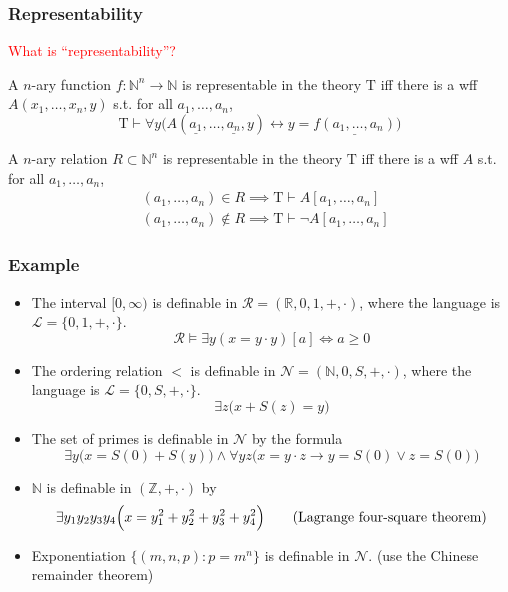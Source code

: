 \documentclass[UTF8,11pt,colorlinks,compress,openany]{beamer}%
\begin{document}
\begin{frame}\frametitle{Representability}
	\begin{block}{}
		\begin{center}
			\textcolor{red}{What is ``representability''?}
		\end{center}
	\end{block}
	\begin{definition}
		A $n$-ary function $f:\mathbb{N}^n\to\mathbb{N}$ is representable in the theory $\mathrm{T}$ iff there is a wff $A(x_1,\dots,x_n,y)$ s.t. for all $a_1,\dots,a_n$,
	\setlength\belowdisplayskip{0pt}
		\[\mathrm{T}\vdash\forall y\Big(A(\underline{a_1},\dots,\underline{a_n},y)\leftrightarrow y=\underline{f(a_1,\dots,a_n)}\Big)\]
	\end{definition}
	\begin{definition}
		A $n$-ary relation $R\subset\mathbb{N}^n$ is representable in the theory $\mathrm{T}$ iff there is a wff $A$ s.t. for all $a_1,\dots,a_n$,
	\setlength\abovedisplayskip{0pt}
	\setlength\belowdisplayskip{0pt}
		\begin{align*}
		&(a_1,\dots,a_n)\in R\implies \mathrm{T}\vdash A[a_1,\dots,a_n]\\
		&(a_1,\dots,a_n)\notin R\implies \mathrm{T}\vdash\neg A[a_1,\dots,a_n]
		\end{align*}
	\end{definition}
	\centering{}
\end{frame}

\begin{frame}\frametitle{Example}
	\begin{itemize}
		\item The interval $[0,\infty)$ is definable in $\mathcal{R}=(\mathbb{R},0,1,+,\cdot)$, where the language is $\mathscr{L}=\{0,1,+,\cdot\}$.
		\[\mathcal{R}\vDash\exists y(x=y\cdot y)[a]\iff a\geq 0\]
		\item The ordering relation $<$ is definable in $\mathcal{N}=(\mathbb{N},0,S,+,\cdot)$, where the language is $\mathscr{L}=\{0,S,+,\cdot\}$.
		\[\exists z\bigl(x+S(z)=y\bigr)\]
		\item The set of primes is definable in $\mathcal{N}$ by the formula
		\[\exists y\bigl(x=S(0)+S(y)\bigr)\wedge\forall yz\bigl(x=y\cdot z\to y=S(0)\vee z=S(0)\bigr)\]
		\item $\mathbb{N}$ is definable in $(\mathbb{Z},+,\cdot)$ by
		\[\exists y_1y_2y_3y_4\Big(x=y_1^2+y_2^2+y_3^2+y_4^2\Big)\tag{\text{Lagrange four-square theorem}}\]
		\item Exponentiation $\big\{(m,n,p): p=m^n\big\}$ is definable in $\mathcal{N}$. (use the Chinese remainder theorem)
	\end{itemize}
\end{frame}
\end{document}
